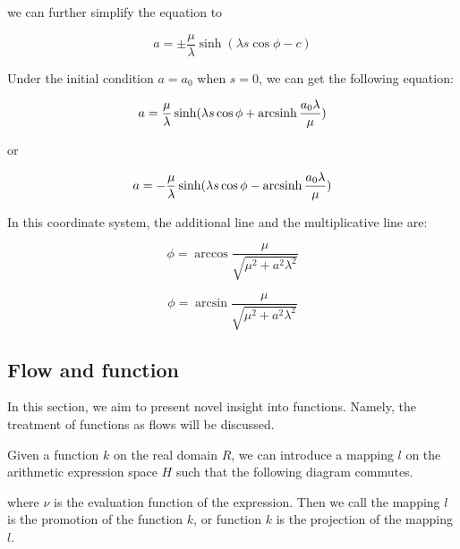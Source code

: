 we can further simplify the equation to

\begin{equation}
  a = \pm \frac{\mu}{\lambda} \sinh(\lambda s \cos \phi - c)\label{eq:gradevo}
\end{equation}

Under the initial condition $a = a_0$ when $s = 0$, we can get the following equation:

\begin{equation}
    a = \frac{\mu}{\lambda} \sinh(\lambda s \cos \phi + \operatorname{arcsinh} \frac{a_0 \lambda}{\mu})\label{eq:gradevo2}
\end{equation}

or

\begin{equation}
    a = - \frac{\mu}{\lambda} \sinh(\lambda s \cos \phi - \operatorname{arcsinh} \frac{a_0 \lambda}{\mu})\label{eq:gradevo3}
\end{equation}

In this coordinate system, the additional line and the multiplicative line are:

\begin{equation}
    \phi = \arccos \frac{\mu}{\sqrt {\mu^2 + a^2 \lambda^2}} \label{eq:additionalline}
\end{equation}

\begin{equation}
    \phi = \arcsin \frac{\mu}{\sqrt {\mu^2 + a^2 \lambda^2}}\label {eq:mulitiplcativeline}
\end{equation}

\subsection{Flow and function}\label{subsec:flow-and-function}

In this section, we aim to present novel insight into functions.
Namely, the treatment of functions as flows will be discussed.

\begin{definition}\label{def:projection}
Given a function $k$ on the real domain $R$, we can introduce a mapping $l$ on the arithmetic expression space $H$ such that the following diagram commutes.

\begin{center}
\end{center}

where $\nu$ is the evaluation function of the expression. Then we call the mapping $l$ is the promotion of the function $k$,
or function $k$ is the projection of the mapping $l$.
\end{definition}

